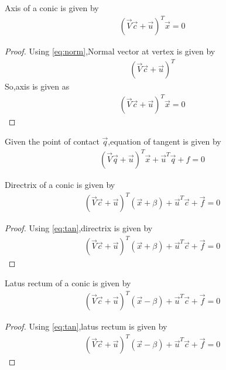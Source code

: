 \documentclass[journal,12pt,twocolumn]{IEEEtran}
\begin{document}
\begin{lemma}
Axis of a conic is given by
\begin{align}
(\vec{V}\vec{c}+\vec{u})^{T}\vec{x} = 0 \label{eq:axis}
\end{align}
\end{lemma}

\begin{proof}
Using \eqref{eq:norm},Normal vector at vertex is given by 
\begin{align}
    (\vec{V}\vec{c} + \vec{u})^T
\end{align}
So,axis is given as 
\begin{align}
    (\vec{V}\vec{c}+\vec{u})^{T}\vec{x} = 0
\end{align}
\end{proof}

\begin{lemma}
Given the point of contact $\vec{q}$,equation of tangent is given by
\begin{align}
    (\vec{V}\vec{q} + \vec{u})^T\vec{x} + \vec{u}^T\vec{q} + f = 0 \label{eq:tan}
\end{align}
\end{lemma}

\begin{lemma}
Directrix of a conic is given by
\begin{align}
(\vec{V}\vec{c}+\vec{u})^T(\vec{x} +\beta) + \vec{u}^T\vec{c} + \vec{f} = 0 \label{eq:directrix}
\end{align}
\end{lemma}

\begin{proof}
Using \eqref{eq:tan},directrix is given by
\begin{align}
    (\vec{V}\vec{c}+\vec{u})^T(\vec{x} +\beta) + \vec{u}^T\vec{c} + \vec{f} = 0
\end{align}
\end{proof}

\begin{lemma}
Latus rectum of a conic is given by 
\begin{align}
(\vec{V}\vec{c}+\vec{u})^T(\vec{x} -\beta) + \vec{u}^T\vec{c} + \vec{f} = 0 \label{eq:latus}
\end{align}
\end{lemma}

\begin{proof}
Using \eqref{eq:tan},latus rectum is given by
\begin{align}
(\vec{V}\vec{c}+\vec{u})^T(\vec{x} -\beta) + \vec{u}^T\vec{c} + \vec{f} = 0
\end{align}
\end{proof}
\end{document}
